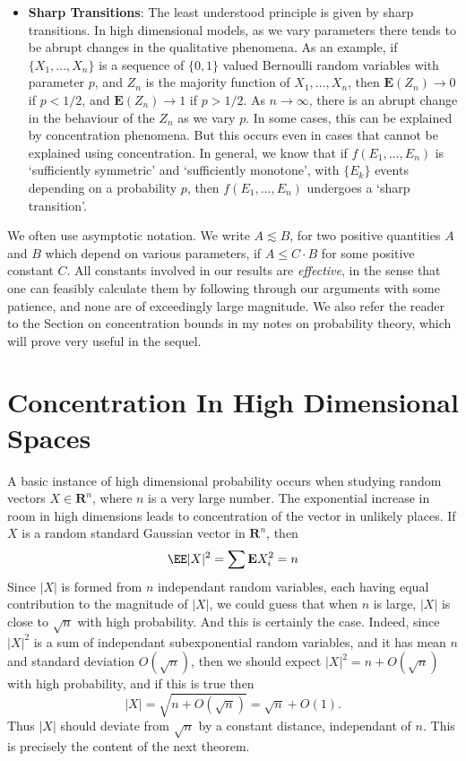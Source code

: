 \begin{itemize}
    \item[] \textbf{Sharp Transitions}: The least understood principle is given by sharp transitions. In high dimensional models, as we vary parameters there tends to be abrupt changes in the qualitative phenomena. As an example, if $\{ X_1, \dots, X_n \}$ is a sequence of $\{ 0, 1 \}$ valued Bernoulli random variables with parameter $p$, and $Z_n$ is the majority function of $X_1, \dots, X_n$, then $\mathbf{E}(Z_n) \to 0$ if $p < 1/2$, and $\mathbf{E}(Z_n) \to 1$ if $p > 1/2$. As $n \to \infty$, there is an abrupt change in the behaviour of the $Z_n$ as we vary $p$. In some cases, this can be explained by concentration phenomena. But this occurs even in cases that cannot be explained using concentration. In general, we know that if $f(E_1, \dots, E_n)$ is `sufficiently symmetric' and `sufficiently monotone', with $\{ E_k \}$ events depending on a probability $p$, then $f(E_1, \dots, E_n)$ undergoes a `sharp transition'.
\end{itemize}

We often use asymptotic notation. We write $A \lesssim B$, for two positive quantities $A$ and $B$ which depend on various parameters, if $A \leq C \cdot B$ for some positive constant $C$. All constants involved in our results are {\it effective}, in the sense that one can feasibly calculate them by following through our arguments with some patience, and none are of exceedingly large magnitude. We also refer the reader to the Section on concentration bounds in my notes on probability theory, which will prove very useful in the sequel.











\chapter{Concentration In High Dimensional Spaces}

A basic instance of high dimensional probability occurs when studying random vectors $X \in \mathbf{R}^n$, where $n$ is a very large number. The exponential increase in room in high dimensions leads to concentration of the vector in unlikely places. If $X$ is a random standard Gaussian vector in $\mathbf{R}^n$, then
%
\[ \EE |X|^2 = \sum \mathbf{E} X_i^2 = n \]
%
Since $|X|$ is formed from $n$ independant random variables, each having equal contribution to the magnitude of $|X|$, we could guess that when $n$ is large, $|X|$ is close to $\sqrt{n}$ with high probability. And this is certainly the case. Indeed, since $|X|^2$ is a sum of independant subexponential random variables, and it has mean $n$ and standard deviation $O(\sqrt{n})$, then we should expect $|X|^2 = n + O(\sqrt{n})$ with high probability, and if this is true then
%
\[ |X| = \sqrt{n + O \left(\sqrt{n}\right) } = \sqrt{n} + O(1). \]
%
Thus $|X|$ should deviate from $\sqrt{n}$ by a constant distance, independant of $n$. This is precisely the content of the next theorem.

